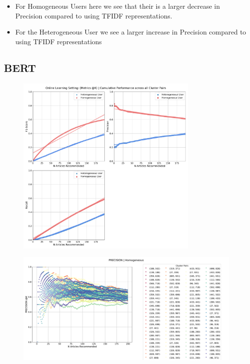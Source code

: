 \documentclass[a4paper,fontsize=8.0pt]{scrartcl}
\begin{document}
\begin{flushleft}
\begin{itemize}
    \item For Homogeneous Users here we see that their is a larger decrease in Precision compared to using TFIDF representations.
    \item For the Heterogeneous User we see a larger increase in Precision compared to using TFIDF representations
\end{itemize}
\end{flushleft}
\subsection{BERT}
\vspace{1ex}
\begin{figure}[H]
 \includegraphics[width=0.8\textwidth]{Graphs/BERT/user_interaction_vs_model_performance_cumu.pdf}
\end{figure}
\vspace{-4ex}
\begin{figure}[H]
 \includegraphics[width=1.0\textwidth]{Graphs/BERT/user_interaction_vs_model_performance_precision_all_cps_Homogeneous.pdf}
\end{figure}
\end{document}

